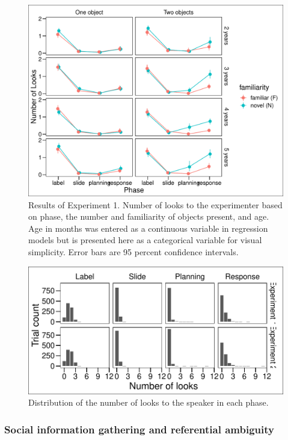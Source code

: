 \documentclass[english,,man]{apa6}
\begin{document}
\begin{figure}
\centering
\includegraphics{figs/resultse1-1.pdf}
\caption{\label{fig:resultse1}Results of Experiment 1. Number of looks to
the experimenter based on phase, the number and familiarity of objects
present, and age. Age in months was entered as a continuous variable in
regression models but is presented here as a categorical variable for
visual simplicity. Error bars are 95 percent confidence intervals.}
\end{figure}

\begin{figure}
\centering
\includegraphics{figs/hist-1.pdf}
\caption{\label{fig:hist}Distribution of the number of looks to the speaker
in each phase.}
\end{figure}

\subsubsection{Social information gathering and referential
ambiguity}\label{social-information-gathering-and-referential-ambiguity}
\end{document}
